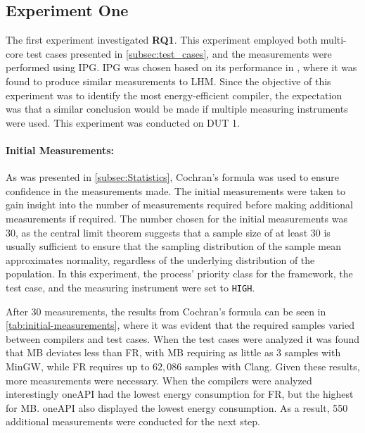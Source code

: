 \subsection{Experiment One}\label{subsec:exp_one}

The first experiment investigated \textbf{RQ1}. This experiment employed both multi-core test cases presented in \cref{subsec:test_cases}, and the measurements were performed using IPG. IPG was chosen based on its performance in \cite{biksbois}, where it was found to produce similar measurements to LHM. Since the objective of this experiment was to identify the most energy-efficient compiler, the expectation was that a similar conclusion would be made if multiple measuring instruments were used. This experiment was conducted on DUT 1.  

\paragraph{Initial Measurements:} As was presented in \cref{subsec:Statistics}, Cochran's formula was used to ensure confidence in the measurements made. The initial measurements were taken to gain insight into the number of measurements required before making additional measurements if required. The number chosen for the initial measurements was 30, as the central limit theorem suggests that a sample size of at least 30 is usually sufficient to ensure that the sampling distribution of the sample mean approximates normality, regardless of the underlying distribution of the population\cite{central-limit-theorem}. In this experiment, the process' priority class for the framework, the test case, and the measuring instrument were set to \texttt{HIGH}.



After 30 measurements, the results from Cochran's formula can be seen in \cref{tab:initial-measurements}, where it was evident that the required samples varied between compilers and test cases. When the test cases were analyzed it was found that MB deviates less than FR, with MB requiring as little as $3$ samples with MinGW, while FR requires up to $62,086$ samples with Clang. Given these results, more measurements were necessary. When the compilers were analyzed interestingly oneAPI had the lowest energy consumption for FR, but the highest for MB. oneAPI also displayed the lowest energy consumption. As a result, 550 additional measurements were conducted for the next step.

